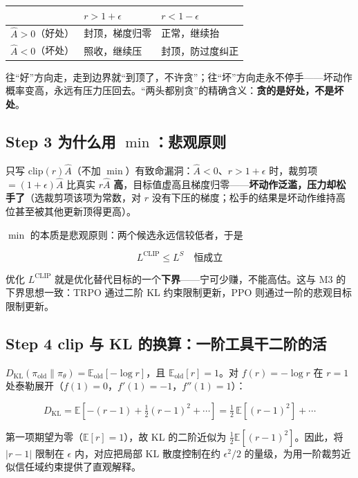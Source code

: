 \documentclass[UTF8,12pt,a4paper]{ctexrep}
\newcommand{\plain}[1]{\begin{plainbox}#1\end{plainbox}}
\begin{document}
\begin{center}
\small
{}
\begin{tabular}{l|l|l}
\toprule
 & $r > 1+\epsilon$ & $r < 1-\epsilon$\\
\midrule
$\hat{A} > 0$（好处）& 封顶，梯度归零 & 正常，继续抬\\
$\hat{A} < 0$（坏处）& 照收，继续压 & 封顶，防过度纠正\\
\bottomrule
\end{tabular}
\end{center}

\plain{往``好''方向走，走到边界就``到顶了，不许贪''；往``坏''方向走永不停手——坏动作概率变高，永远有压力压回去。``两头都别贪''的精确含义：\textbf{贪的是好处，不是坏处}。}

\subsection*{Step 3 \; 为什么用 $\min$：悲观原则}

只写 $\mathrm{clip}(r)\hat{A}$（不加 $\min$）有致命漏洞：$\hat{A}<0$、$r>1+\epsilon$ 时，裁剪项 $=(1+\epsilon)\hat{A}$ 比真实 $r\hat{A}$ \textbf{高}，目标值虚高且梯度归零——\textbf{坏动作泛滥，压力却松手了}（选裁剪项该项为常数，对 $r$ 没有下压的梯度；松手的结果是坏动作维持高位甚至被其他更新顶得更高）。

$\min$ 的本质是悲观原则：两个候选永远信较低者，于是

$$
L^{\mathrm{CLIP}} \le L^{S} \quad \text{恒成立}
$$

优化 $L^{\mathrm{CLIP}}$ 就是优化替代目标的一个\textbf{下界}——宁可少赚，不能高估。这与 M3 的下界思想一致：TRPO 通过二阶 KL 约束限制更新，PPO 则通过一阶的悲观目标限制更新。

\subsection*{Step 4 \; clip 与 KL 的换算：一阶工具干二阶的活}

$D_{\mathrm{KL}}(\pi_{\mathrm{old}}\|\pi_\theta) = \mathbb{E}_{\mathrm{old}}[-\log r]$，且 $\mathbb{E}_{\mathrm{old}}[r] = 1$。对 $f(r) = -\log r$ 在 $r=1$ 处泰勒展开（$f(1)=0$，$f'(1)=-1$，$f''(1)=1$）：

$$
D_{\mathrm{KL}} = \mathbb{E}\left[-(r-1) + \tfrac{1}{2}(r-1)^2 + \cdots\right] = \tfrac{1}{2}\,\mathbb{E}\left[(r-1)^2\right] + \cdots
$$

第一项期望为零（$\mathbb{E}[r]=1$），故 KL 的二阶近似为 $\frac{1}{2}\mathbb{E}[(r-1)^2]$。因此，将 $|r-1|$ 限制在 $\epsilon$ 内，对应把局部 KL 散度控制在约 $\epsilon^2/2$ 的量级，为用一阶裁剪近似信任域约束提供了直观解释。
\end{document}
